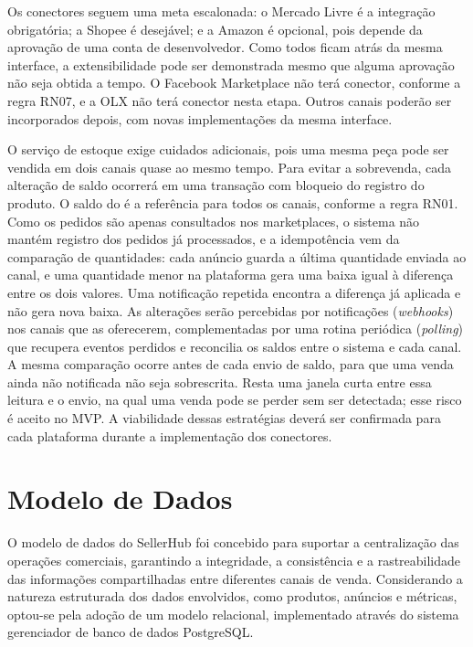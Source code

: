Os conectores seguem uma meta escalonada: o Mercado Livre é a integração obrigatória; a Shopee é desejável; e a Amazon é opcional, pois depende da aprovação de uma conta de desenvolvedor. Como todos ficam atrás da mesma interface, a extensibilidade pode ser demonstrada mesmo que alguma aprovação não seja obtida a tempo. O Facebook Marketplace não terá conector, conforme a regra RN07, e a OLX não terá conector nesta etapa. Outros canais poderão ser incorporados depois, com novas implementações da mesma interface.

O serviço de estoque exige cuidados adicionais, pois uma mesma peça pode ser vendida em dois canais quase ao mesmo tempo. Para evitar a sobrevenda, cada alteração de saldo ocorrerá em uma transação com bloqueio do registro do produto. O saldo do \sistema{} é a referência para todos os canais, conforme a regra RN01. Como os pedidos são apenas consultados nos marketplaces, o sistema não mantém registro dos pedidos já processados, e a idempotência vem da comparação de quantidades: cada anúncio guarda a última quantidade enviada ao canal, e uma quantidade menor na plataforma gera uma baixa igual à diferença entre os dois valores. Uma notificação repetida encontra a diferença já aplicada e não gera nova baixa. As alterações serão percebidas por notificações (\textit{webhooks}) nos canais que as oferecerem, complementadas por uma rotina periódica (\textit{polling}) que recupera eventos perdidos e reconcilia os saldos entre o sistema e cada canal. A mesma comparação ocorre antes de cada envio de saldo, para que uma venda ainda não notificada não seja sobrescrita. Resta uma janela curta entre essa leitura e o envio, na qual uma venda pode se perder sem ser detectada; esse risco é aceito no MVP. A viabilidade dessas estratégias deverá ser confirmada para cada plataforma durante a implementação dos conectores.

\section{Modelo de Dados}

O modelo de dados do SellerHub foi concebido para suportar a centralização das operações comerciais, garantindo a integridade, a consistência e a rastreabilidade das informações compartilhadas entre diferentes canais de venda. Considerando a natureza estruturada dos dados envolvidos, como produtos, anúncios e métricas, optou-se pela adoção de um modelo relacional, implementado através do sistema gerenciador de banco de dados PostgreSQL.

